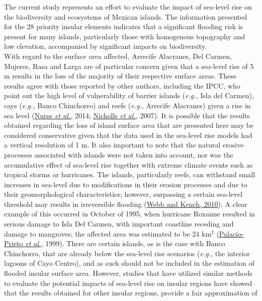 \documentclass{article} %
\begin{document}
The current study represents an effort to evaluate the impact of sea-level rise on the
biodiversity and ecosystems of Mexican islands. The information presented for the 28
priority insular elements indicates that a significant flooding risk is present for many
islands, particularly those with homogenous topography and low elevation,
accompanied by significant impacts on biodiversity.\\

With regard to the surface area affected, Arrecife Alacranes, Del Carmen, Mujeres,
Rasa and Larga are of particular concern given that a sea-level rise of 5 m results in
the loss of the majority of their respective surface areas. These results agree with
those reported by other authors, including the IPCC, who point out the high level of
vulnerability of barrier islands (\textit{e.g.,} Isla del Carmen), cays (\textit{e.g.,} Banco Chinchorro)
and reefs (\textit{e.g.}, Arrecife Alacranes) given a rise in sea level (\hyperlink{nurse}{Nurse \textit{et al.,}} 2014; \hyperlink{nicholls}{Nicholls \textit{et al.,}} 2007). It is possible that the results obtained regarding the loss of
island surface area that are presented here may be considered conservative given
that the data used in the sea-level rise models had a vertical resolution of 1 m. It
also important to note that the natural erosive processes associated with islands were
not taken into account, nor was the accumulative effect of sea-level rise together
with extreme climate events such as tropical storms or hurricanes. The islands,
particularly reefs, can withstand small increases in sea-level due to modifications in
their erosion processes and due to their geomorphological characteristics; however,
surpassing a certain sea-level threshold may results in irreversible flooding (\hyperlink{webb}{Webb
and Kench, 2010}). A clear example of this occurred in October of 1995, when
hurricane Roxanne resulted in serious damage to Isla Del Carmen, with important
coastline receding and damage to mangroves; the affected area was estimated to be
24 km$^{2}$
(\hyperlink{palacio}{Palacio-Prieto \textit{et al.,}} 1999). There are certain islands, as is the case with
Banco Chinchorro, that are already below the sea-level rise scenarios (\textit{e.g.,} the
interior lagoons of Cayo Centro), and as such should not be included in the estimation
of flooded insular surface area. However, studies that have utilized similar methods
to evaluate the potential impacts of sea-level rise on insular regions have showed
that the results obtained for other insular regions, provide a fair approximation of
\end{document}
